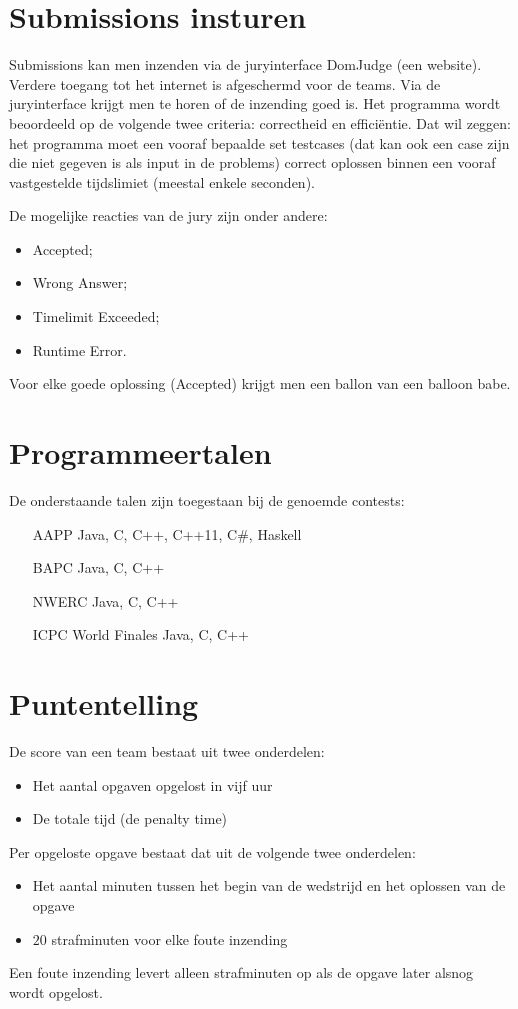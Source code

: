 \section{Submissions insturen}
Submissions kan men inzenden via de juryinterface DomJudge (een website). Verdere toegang tot het internet is afgeschermd voor de teams. Via de juryinterface krijgt men te horen of de inzending goed is. Het programma wordt beoordeeld op de volgende twee criteria: correctheid en effici\"entie. Dat wil zeggen: het programma moet een vooraf bepaalde set testcases (dat kan ook een case zijn die niet gegeven is als input in de problems) correct oplossen binnen een vooraf vastgestelde tijdslimiet (meestal enkele seconden).

De mogelijke reacties van de jury zijn onder andere:
\begin{itemize}
\item Accepted;
\item Wrong Answer;
\item Timelimit Exceeded;
\item Runtime Error.
\end{itemize}
Voor elke goede oplossing (Accepted) krijgt men een ballon van een balloon babe.

\section{Programmeertalen}
De onderstaande talen zijn toegestaan bij de genoemde contests:
\begin{itemize}
\item[AAPP] Java, C, C++, C++11, C\#, Haskell
\item[BAPC] Java, C, C++
\item[NWERC] Java, C,  C++
\item[ICPC World Finales] Java, C, C++
\end{itemize}

\section{Puntentelling}
De score van een team bestaat uit twee onderdelen:
\begin{itemize}
\item Het aantal opgaven opgelost in vijf uur
\item De totale tijd (de penalty time)
\end{itemize}
Per opgeloste opgave bestaat dat uit de volgende twee onderdelen:
\begin{itemize}
\item Het aantal minuten tussen het begin van de wedstrijd en het oplossen van de opgave
\item $20$ strafminuten voor elke foute inzending
\end{itemize}
Een foute inzending levert alleen strafminuten op als de opgave later alsnog wordt opgelost.

